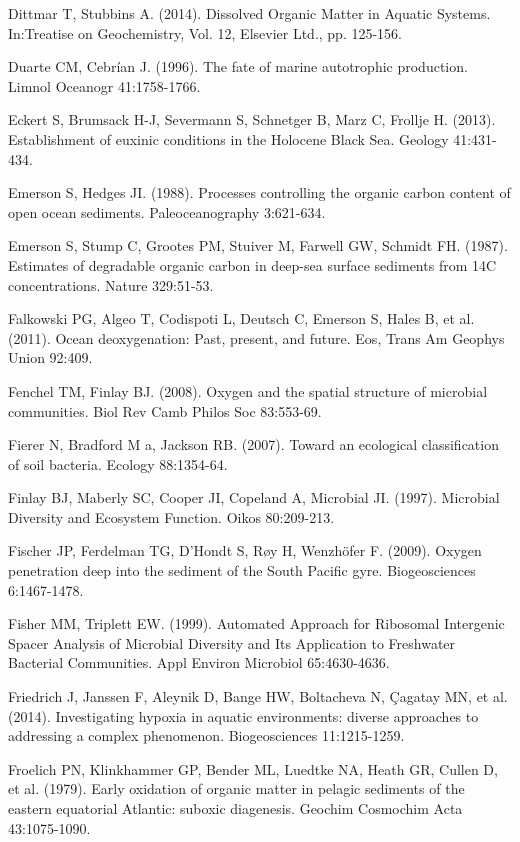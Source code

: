 Dittmar T, Stubbins A. (2014). Dissolved Organic Matter in Aquatic Systems. In:Treatise on Geochemistry, Vol. 12, Elsevier Ltd., pp. 125-156.

Duarte CM, Cebrían J. (1996). The fate of marine autotrophic production. Limnol Oceanogr 41:1758-1766.

Eckert S, Brumsack H-J, Severmann S, Schnetger B, Marz C, Frollje H. (2013). Establishment of euxinic conditions in the Holocene Black Sea. Geology 41:431-434.

Emerson S, Hedges JI. (1988). Processes controlling the organic carbon content of open ocean sediments. Paleoceanography 3:621-634.

Emerson S, Stump C, Grootes PM, Stuiver M, Farwell GW, Schmidt FH. (1987). Estimates of degradable organic carbon in deep-sea surface sediments from 14C concentrations. Nature 329:51-53.

Falkowski PG, Algeo T, Codispoti L, Deutsch C, Emerson S, Hales B, et al. (2011). Ocean deoxygenation: Past, present, and future. Eos, Trans Am Geophys Union 92:409.

Fenchel TM, Finlay BJ. (2008). Oxygen and the spatial structure of microbial communities. Biol Rev Camb Philos Soc 83:553-69.

Fierer N, Bradford M a, Jackson RB. (2007). Toward an ecological classification of soil bacteria. Ecology 88:1354-64.

Finlay BJ, Maberly SC, Cooper JI, Copeland A, Microbial JI. (1997). Microbial Diversity and Ecosystem Function. Oikos 80:209-213.

Fischer JP, Ferdelman TG, D’Hondt S, R{\o}y H, Wenzh\" ofer F. (2009). Oxygen penetration deep into the sediment of the South Pacific gyre. Biogeosciences 6:1467-1478.

Fisher MM, Triplett EW. (1999). Automated Approach for Ribosomal Intergenic Spacer Analysis of Microbial Diversity and Its Application to Freshwater Bacterial Communities. Appl Environ Microbiol 65:4630-4636.

Friedrich J, Janssen F, Aleynik D, Bange HW, Boltacheva N, Çagatay MN, et al. (2014). Investigating hypoxia in aquatic environments: diverse approaches to addressing a complex phenomenon. Biogeosciences 11:1215-1259.

Froelich PN, Klinkhammer GP, Bender ML, Luedtke NA, Heath GR, Cullen D, et al. (1979). Early oxidation of organic matter in pelagic sediments of the eastern equatorial Atlantic: suboxic diagenesis. Geochim Cosmochim Acta 43:1075-1090.

